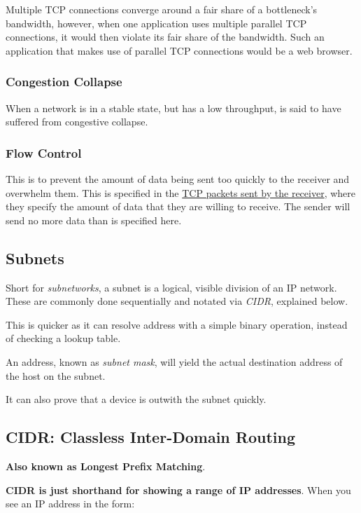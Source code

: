 \documentclass{article}
\begin{document}
Multiple TCP connections converge around a fair share of a bottleneck's bandwidth, however, when one application uses multiple parallel TCP connections, it would then violate its fair share of the bandwidth. Such an application that makes use of parallel TCP connections would be a web browser.

\subsubsection{Congestion Collapse}

When a network is in a stable state, but has a low throughput, is said to have suffered from congestive collapse.

\subsubsection{Flow Control}

This is to prevent the amount of data being sent too quickly to the receiver and overwhelm them. This is specified in the \underline{TCP packets sent by the receiver}, where they specify the amount of data that they are willing to receive. The sender will send no more data than is specified here.


\subsection{Subnets}

Short for \textit{subnetworks}, a subnet is a logical, visible division of an IP network. These are commonly done sequentially and notated via \textit{CIDR}, explained below.

This is quicker as it can resolve address with a simple binary operation, instead of checking a lookup table.

An address, known as \textit{subnet mask}, will yield the actual destination address of the host on the subnet.

It can also prove that a device is outwith the subnet quickly.

\subsection{CIDR: Classless Inter-Domain Routing}

\textbf{Also known as Longest Prefix Matching}.

\textbf{CIDR is just shorthand for showing a range of IP addresses}. When you see
an IP address in the form:
\end{document}
